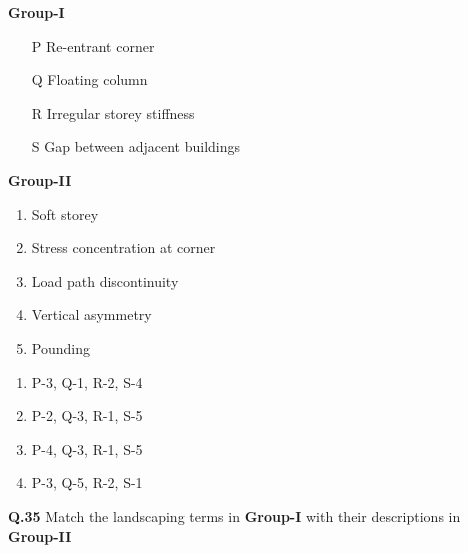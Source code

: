 \documentclass{article}
\begin{document}
\begin{multicols}{2}
\noindent \hspace{2cm} \textbf  {Group-I}
\begin{enumerate}[label=\Alph*., leftmargin=1.5cm]
    \item[P] Re-entrant corner
    \item[Q] Floating column
    \item[R] Irregular storey stiffness
    \item[S] Gap between adjacent buildings
\end{enumerate}

\columnbreak

\noindent\hspace{1cm} \textbf{Group-II}
\begin{enumerate}[label=\arabic*., leftmargin=1.5cm]
    \item Soft storey
    \item Stress concentration at corner
    \item Load path discontinuity
    \item Vertical asymmetry
    \item Pounding
\end{enumerate}
\end{multicols}

\begin{multicols}{2}
\begin{enumerate}[label=(\Alph*) , leftmargin=1.5cm]
    \item P-3, Q-1, R-2, S-4
    \item P-2, Q-3, R-1, S-5
    \item P-4, Q-3, R-1, S-5
    \item P-3, Q-5, R-2, S-1
\end{enumerate}
\end{multicols}

\noindent\textbf{Q.35} Match the landscaping terms in \textbf{Group-I} with their descriptions in \textbf{Group-II}
\end{document}
